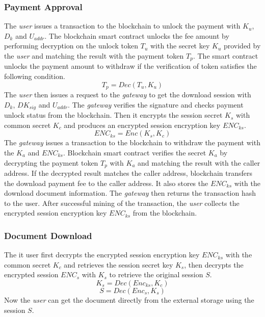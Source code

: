 \documentclass[conference]{IEEEtran}
\begin{document}
\subsubsection{Payment Approval}
The {\it user} issues a transaction to the blockchain to unlock the payment with $K_u$, $D_k$ and $U_{addr}$. The blockchain smart contract unlocks the fee amount by performing decryption on the unlock token $T_u$ with the secret key $K_u$ provided by the {\it user} and matching the result with the payment token $T_p$. The smart contract unlocks the payment amount to withdraw if the verification of token satisfies the following condition.
\begin{equation}
\label{eq-d-6} 
T_p = Dec (T_u, K_u)
\end{equation}
The {\it user} then issues a request to the {\it gateway} to get the download session with $D_k$, $DK_{sig}$ and $U_{addr}$. The {\it gateway} verifies the signature and checks payment unlock status from the  blockchain. Then it encrypts the session secret $K_s$ with common secret $K_c$ and produces an encrypted session encryption key $ENC_{ks}$.
\begin{equation}
\label{eq-d-7} 
ENC_{ks} = Enc (K_s, K_c)
\end{equation}
The {\it gateway} issues a transaction to the blockchain to withdraw the payment with the $K_a$ and $ENC_{ks}$. Blockchain smart contract verifies the secret $K_a$ by decrypting the payment token $T_p$ with $K_a$ and matching the result with the caller address. If the decrypted result matches the caller address, blockchain transfers the download payment fee to the caller address. It also stores the $ENC_{ks}$ with the download document information. The {\it gateway} then returns the transaction hash to the user. After successful mining of the transaction, the {\it user} collects the encrypted session encryption key $ENC_{ks}$ from the blockchain.

\subsubsection{Document Download}
The {it user} first decrypts the encrypted session encryption key $ENC_{ks}$ with the common secret $K_c$ and retrieves the session secret key $K_s$, then decrypts the encrypted session $ENC_s$ with $K_s$ to retrieve the original session $S$.
\begin{equation}
\label{eq-d-8} 
K_s = Dec (Enc_{ks}, K_c)
\end{equation}
\begin{equation}
\label{eq-d-9} 
S = Dec (Enc_s, K_s)
\end{equation}
Now the {\it user} can get the document directly from the external storage using the session $S$.
\end{document}
